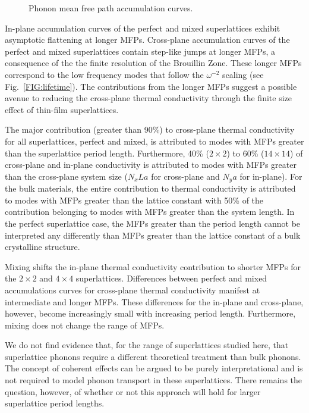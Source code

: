 \documentclass[aps,prb,preprint,preprintnumbers,amsmath,amssymb,floatfix,superscriptaddress]{revtex4}
\begin{document}
\begin{figure}%
\begin{center}
\renewcommand{\figure}{Fig.}
\caption{Phonon mean free path accumulation curves.}
\label{FIG:MFP_cuml}
\end{center}
\end{figure}
In-plane accumulation curves of the perfect and mixed superlattices exhibit asymptotic flattening at longer MFPs. Cross-plane accumulation curves of the perfect and mixed superlattices contain step-like jumps at longer MFPs, a consequence of the the finite resolution of the Brouillin Zone.\cite{esfarjani2011heat} These longer MFPs correspond to the low frequency modes that follow the $\omega^{-2}$ scaling (see Fig.~\ref{FIG:lifetime}). The contributions from the longer MFPs suggest a possible avenue to reducing the cross-plane thermal conductivity through the finite size effect of thin-film superlattices.\cite{Luckyanova16112012} 

The major contribution (greater than 90\%) to cross-plane thermal conductivity for all superlattices, perfect and mixed, is attributed to modes with MFPs greater than the superlattice period length. Furthermore, 40\% ($2 \times 2 $) to 60\% ($14 \times 14$) of cross-plane and in-plane conductivity is attributed to modes with MFPs greater than the cross-plane system size ($N_xLa$ for cross-plane and $N_ya$ for in-plane). For the bulk materials, the entire contribution to thermal conductivity is attributed to modes with MFPs greater than the lattice constant with 50\% of the contribution belonging to modes with MFPs greater than the system length. In the perfect superlattice case, the MFPs greater than the period length cannot be interpreted any differently than MFPs greater than the lattice constant of a bulk crystalline structure.

Mixing shifts the in-plane thermal conductivity contribution to shorter MFPs for the $2 \times 2 $ and $4 \times 4 $ superlattices. Differences between perfect and mixed accumulations curves for cross-plane thermal conductivity manifest at intermediate and longer MFPs. These differences for the in-plane and cross-plane, however, become increasingly small with increasing period length. Furthermore, mixing does not change the range of MFPs. 

We do not find evidence that, for the range of superlattices studied here, that superlattice phonons require a different theoretical treatment than bulk phonons. The concept of coherent effects can be argued to be purely interpretational and is not required to model phonon transport in these superlattices. There remains the question, however, of whether or not this approach will hold for larger superlattice period lengths.
\end{document}
